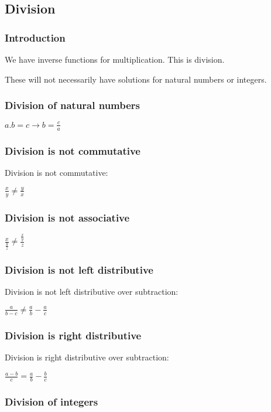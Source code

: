 
\subsection{Division}

\subsubsection{Introduction}

We have inverse functions for multiplication. This is division.

These will not necessarily have solutions for natural numbers or integers. 

\subsubsection{Division of natural numbers}

\(a.b=c\rightarrow b=\frac{c}{a}\)
	
\subsubsection{Division is not commutative}

Division is not commutative:

\(\frac{x}{y}\ne \frac{y}{x}\)

\subsubsection{Division is not associative}

\(\frac{x}{\frac{y}{z}}\ne \frac{\frac{x}{y}}{z}\)

\subsubsection{Division is not left distributive}

Division is not left distributive over subtraction:

\(\frac{a}{b-c} \ne \frac{a}{b} -\frac{a}{c}\)

\subsubsection{Division is right distributive}

Division is right distributive over subtraction:

\(\frac{a-b}{c} =\frac{a}{b} -\frac{b}{c}\)
	


\subsubsection{Division of integers}

